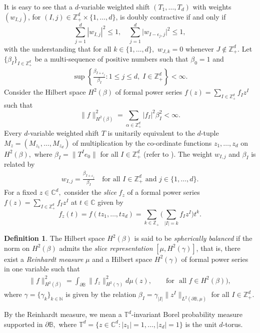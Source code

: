 \documentclass[12pt,reqno] {amsart}
\theoremstyle{remark}
\theoremstyle{definition}
\newtheorem{definition}[theorem]{Definition}%
\begin{document}
It is easy to see that a \( d \)-variable weighted shift \( (T_1, \dots, T_d) \) with weights \( (w_{I,j}) \), for \( (I,j) \in \mathbb{Z}_+^d \times \{1,\ldots,d\} \), is doubly contractive if and only if 
\[
\sum_{j=1}^d |{w}_{I,j}|^2 \leq 1, \quad
\sum_{j=1}^d \big| {w}_{I - \epsilon_j ,j} \big|^2 \leq 1,
\]
with the understanding that for all $k\in\{1,\ldots, d\},$ $w_{J,k}=0$ whenever $J\notin \mathbb Z_{+}^d.$
Let $\{\beta_I\}_{I \in \mathbb{Z}_+^d}$ be a multi-sequence of
positive numbers such that $\beta _0 =1$ and
\begin{eqnarray*}
    \sup \left\{\frac{\beta_{I+\varepsilon_j}} {\beta_I} : 1 \leq j \leq d, \;  I \in \mathbb{Z}_+^d\right\} < \infty. 
\end{eqnarray*}
Consider the Hilbert space $H^2(\beta)$ of formal power series
$f(z)=\sum_{I \in  \mathbb{Z}_+^d} f_I z^I$ such that
$$ \|f\|^2_{H^2(\beta)}=\sum_{\alpha \in  \mathbb{Z}_+^d}|f_I |^2 \beta^2_I <
\infty.$$
Every $d$-variable weighted shift $T$ is unitarily equivalent to the $d$-tuple $M_z=(M_{z_1}, \ldots, M_{z_d})$ of multiplication by the co-ordinate functions $z_1, \ldots, z_d$ on $H^2(\beta),$ where $\beta_I = \|T^Ie_0\|$  for all $I \in \mathbb{Z}_+^d$ (refer to  \cite[Proposition 8]{J-L}). 
The weight $w_{I,j}$ and $\beta_I$ is related by
\begin{eqnarray*}
     w_{I,j} =\frac{\beta_{I+\varepsilon_j}} {\beta_I}  \quad \text{for all } I \in \mathbb{Z}_+^d \text{ and } j \in \{1,\dots ,d\}.
\end{eqnarray*}
For a fixed $z \in \mathbb C^d, $ consider the {\it slice} $f_z$ of a formal power series $f(z)=\sum_{I \in  \mathbb{Z}_+^d} f_I z^I$ at $t \in \mathbb C$ given by
\[f_z(t)=f(tz_1, \ldots, tz_d)=\sum_{k \in \mathbb Z_+} \Big(\sum_{ |I|=k}f_Iz^I \Big) t^k.\]

\begin{definition}\label{Spherically Balanced- definition}
    The Hilbert space $H^2(\beta)$ is said to be {\it spherically balanced} if the norm on $H^2(\beta)$
admits the {\it slice representation} $[\mu, H^2(\gamma)]$, that is, there exist a {\it Reinhardt measure} $\mu$
and a Hilbert
space $H^2(\gamma)$ of formal power series in one variable such that
\begin{eqnarray*}
     \|{f}\|^2_{H^2(\beta)} = \int_{\partial \mathbb
	B}\|{f_z}\|^2_{H^2(\gamma)}d\mu(z), \qquad \mbox{for ~all~} f \in
H^2(\beta)),
\end{eqnarray*}
where $\gamma =\{\gamma_k\}_{k \in \mathbb N}$ is given by the relation
$\beta_I=\gamma_{|I|}\|z^I\|_{L^2(\partial \mathbb B, \mu)}$ for all $I \in \mathbb{Z}_+^d.$
\end{definition}
By the Reinhardt measure, we mean a $\mathbb T^d$-invariant Borel probability measure supported in $\partial \mathbb B,$
where $\mathbb T^d=\{z \in \mathbb C^d:|z_1|=1,\ldots,|z_d|=1\}$ is the unit $d$-torus.
\end{document}
